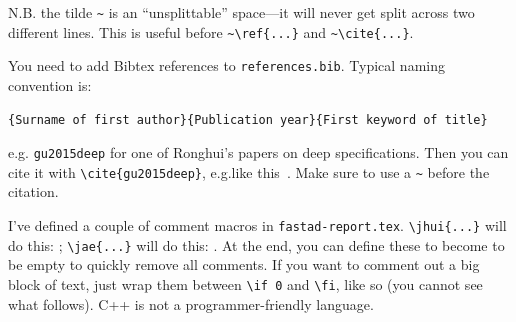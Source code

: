 N.B. the tilde \verb|~| is an ``unsplittable'' space---it will never get
split across two different lines. This is useful before \verb|~\ref{...}|
and \verb|~\cite{...}|.

You need to add Bibtex references to \verb|references.bib|. Typical naming
convention is:
\begin{verbatim}
{Surname of first author}{Publication year}{First keyword of title}
\end{verbatim}
e.g. \verb|gu2015deep| for one of Ronghui's papers on deep specifications.
Then you can cite it with \verb|\cite{gu2015deep}|,
e.g.like this~\cite{gu2015deep}.
Make sure to use a \verb|~| before the citation.

I've defined a couple of comment macros in \verb|fastad-report.tex|.
\verb|\jhui{...}| will do this: ;
\verb|\jae{...}| will do this: .
At the end, you can define these to become to be empty to quickly remove all
comments.
If you want to comment out a big block of text, just wrap them between
\verb|\if 0| and \verb|\fi|, like so (you cannot see what follows).
C++ is not a programmer-friendly language.
\fi
